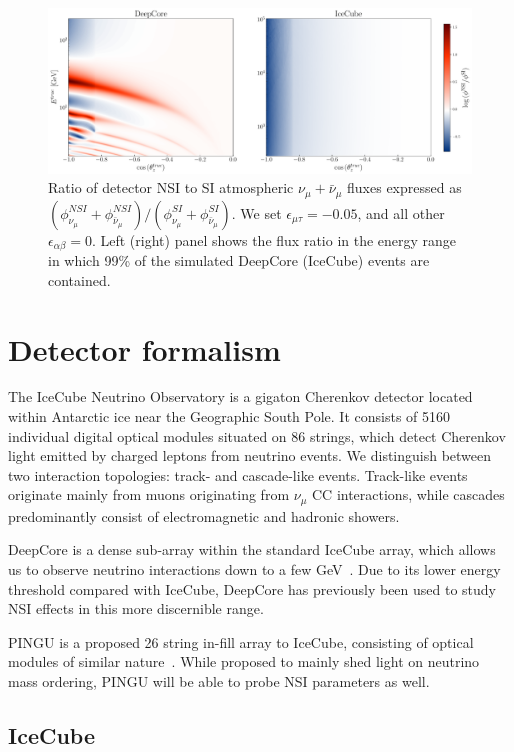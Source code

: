 \documentclass{article}
\newcommand{\emt}{\ensuremath{\epsilon_{\mu\tau}}}
\newcommand{\nm}{\nu_\mu}
\begin{document}
\begin{figure}[!tb]
   \begin{center}
      \includegraphics[width=0.8\linewidth]{figures/flux_ratio.pdf}
   \end{center}
   \caption{Ratio of detector NSI to SI atmospheric $\nu_\mu + \bar{\nu}_\mu$ fluxes expressed as $(\phi_{\nu_\mu}^{NSI} + \phi_{\bar\nu_\mu}^{NSI})/(\phi_{\nu_\mu}^{SI} + \phi_{\bar\nu_\mu}^{SI})$.
   We set $\emt = -0.05$, and all other $\epsilon_{\alpha\beta}=0$. 
   Left (right) panel shows the flux ratio in the energy range in which 99\% of the simulated DeepCore (IceCube) events are contained.
   }\label{fig:flux_ratio}
\end{figure}

\section{Detector formalism} %
The IceCube Neutrino Observatory is a gigaton Cherenkov detector located within Antarctic ice near the Geographic 
South Pole. It consists of 5160 individual digital optical modules situated on 86 strings, which detect Cherenkov light emitted by charged leptons
from neutrino events. We distinguish between two interaction topologies: track- and cascade-like events. Track-like events originate mainly
from muons originating from $\nm$ CC interactions, while cascades predominantly consist of electromagnetic and hadronic showers. 

DeepCore is a dense sub-array within the standard IceCube array, which allows us to observe neutrino interactions down to a few GeV~\cite{DC2021}.
Due to its lower energy threshold compared with IceCube, DeepCore has previously been used to study NSI effects in this more discernible range\cite{DC2021,deepcoreNSI}.

PINGU is a proposed 26 string in-fill array to IceCube, consisting of optical modules of similar nature~\cite{PINGUletter}. While proposed to mainly shed light on 
neutrino mass ordering, PINGU will be able to probe NSI parameters as well.  
\subsection{IceCube}\label{ch:ICmethod}
\end{document}
